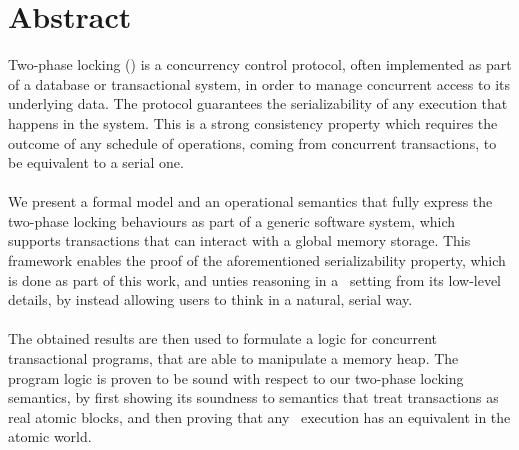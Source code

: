 \vspace*{\fill}
\section*{Abstract}

Two-phase locking (\tpl) is a concurrency control protocol, often implemented as part of a database or transactional system, in order to manage concurrent access to its underlying data. The protocol guarantees the serializability of any execution that happens in the system. This is a strong consistency property which requires the outcome of any schedule of operations, coming from concurrent transactions, to be equivalent to a serial one. \\ \\
We present a formal model and an operational semantics that fully express the two-phase locking behaviours as part of a generic software system, which supports transactions that can interact with a global memory storage. This framework enables the proof of the aforementioned serializability property, which is done as part of this work, and unties  reasoning in a \tpl\ setting from its low-level details, by instead allowing users to think in a natural, serial way. \\ \\
The obtained results are then used to formulate a logic for concurrent transactional programs, that are able to manipulate a memory heap. The program logic is proven to be sound with respect to our two-phase locking semantics, by first showing its soundness to semantics that treat transactions as real atomic blocks, and then proving that any \tpl\ execution has an equivalent in the atomic world.
\vspace*{\fill}